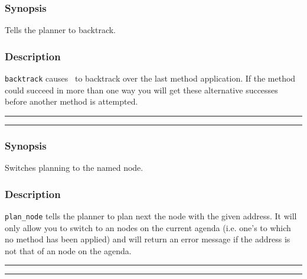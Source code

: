 
\subsubsection*{Synopsis}
Tells the planner to backtrack.  

\subsubsection*{Description}
{\tt backtrack} causes \lclam\ to backtrack over the last
method application.  If the method could succeed in more
than one way you will get these alternative successes before another
method is attempted.

\vspace{2mm}
\hrule
\vspace{2mm}
\begin{Large}
\end{Large}
\vspace{2mm}
\hrule
\vspace{2mm}


\subsubsection*{Synopsis}
Switches planning to the named node.

\subsubsection*{Description}
{\tt plan\_node} tells the planner to plan next the
node with the given address. 
It will only allow you to switch to an  nodes on the
current agenda (i.e. one's to which no
method has been applied) and 
will return an error message if the address is not that of an node on
the agenda.

\vspace{2mm}
\hrule
\vspace{2mm}
\begin{Large}
\end{Large}
\vspace{2mm}
\hrule
\vspace{2mm}


